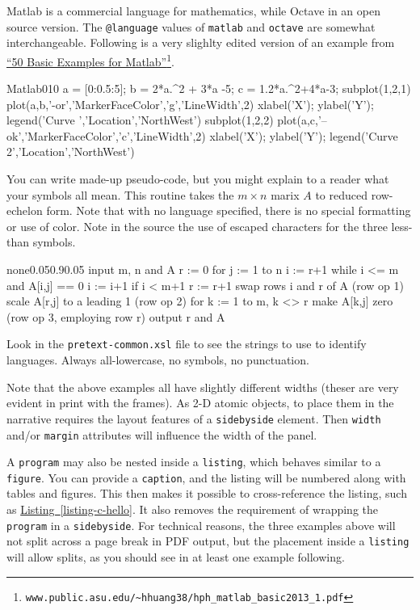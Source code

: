 \documentclass{sn-jnl}
\theoremstyle{thmstyleone}%
\theoremstyle{thmstyletwo}%
\theoremstyle{thmstylethree}%
\newcommand{\xreffont}{\relax}
\newcommand{\mono}[1]{\texttt{#1}}
\numberwithin{equation}{section}
\begin{document}
Matlab is a commercial language for mathematics, while Octave in an open source version.  The \mono{@language} values of \mono{matlab} and \mono{octave} are somewhat interchangeable.  Following is a very slighlty edited version of an example from \href{http://www.public.asu.edu/\~hhuang38/hph_matlab_basic2013_1.pdf}{``50 Basic Examples for Matlab''}\footnote{\nolinkurl{www.public.asu.edu/\~hhuang38/hph_matlab_basic2013_1.pdf}\label{section-programs-7-5}}.%
\begin{program}{Matlab}{0}{1}{0}
a = [0:0.5:5]; %
b = 2*a.^2 + 3*a -5;
c = 1.2*a.^2+4*a-3;
subplot(1,2,1)
plot(a,b,'-or','MarkerFaceColor','g','LineWidth',2)
xlabel('X'); ylabel('Y'); legend('Curve ','Location','NorthWest')
subplot(1,2,2)
plot(a,c,'--ok','MarkerFaceColor','c','LineWidth',2)
xlabel('X'); ylabel('Y'); legend('Curve 2','Location','NorthWest')
\end{program}
You can write made-up pseudo-code, but you might explain to a reader what your symbols all mean.  This routine takes the \(m\times n\) marix \(A\) to reduced row-echelon form.  Note that with no language specified, there is no special formatting or use of color.  Note in the source the use of escaped characters for the three less-than symbols.%
\begin{program}{none}{0.05}{0.9}{0.05}
input m, n and A
r := 0
for j := 1 to n
   i := r+1
   while i <= m and A[i,j] == 0
       i := i+1
   if i < m+1
       r := r+1
       swap rows i and r of A (row op 1)
       scale A[r,j] to a leading 1 (row op 2)
       for k := 1 to m, k <> r
           make A[k,j] zero (row op 3, employing row r)
output r and A
\end{program}
Look in the \mono{pretext-common.xsl} file to see the strings to use to identify languages.  Always all-lowercase, no symbols, no punctuation.%
\par
Note that the above examples all have slightly different widths (theser are very evident in print with the frames).  As 2-D atomic objects, to place them in the narrative requires the layout features of a \mono{sidebyside} element.  Then \mono{width} and\slash{}or \mono{margin} attributes will influence the width of the panel.%
\par
A \mono{program} may also be nested inside a \mono{listing}, which behaves similar to a \mono{figure}.  You can provide a \mono{caption}, and the listing will be numbered along with tables and figures.  This then makes it possible to cross-reference the listing, such as \hyperref[listing-c-hello]{Listing~{\xreffont\ref{listing-c-hello}}}.  It also removes the requirement of wrapping the \mono{program} in a \mono{sidebyside}.  For technical reasons, the three examples above will not split across a page break in PDF output, but the placement inside a \mono{listing} will allow splits, as you should see in at least one example following.%
\end{document}
